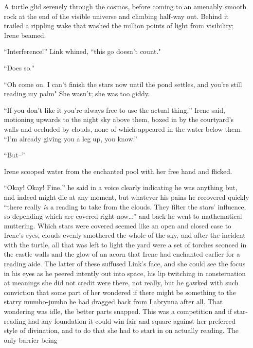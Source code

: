 \documentclass[../FGP.tex]{subfiles}
\begin{document}
A turtle glid serenely through the cosmos, before coming to an amenably smooth rock at the end of the visible universe and climbing half-way out. Behind it trailed a rippling wake that washed the million points of light from visibility; Irene beamed.

\normalmarginpar``Interference!'' Link whined, ``this go doesn't count."  

``Does so." 

``Oh come on. I can't finish the stars now until the pond settles, and you're still reading my palm" She wasn't; she was too giddy.

``If you don't like it you're always free to use the actual thing,'' Irene said, motioning upwards to the night sky above them, boxed in by the courtyard's walls and occluded by clouds, none of which appeared in the water below them. ``I'm already giving you a leg up, you know.''

``But--'' 

Irene scooped water from the enchanted pool with her free hand and flicked. 

``Okay! Okay! Fine,'' he said in a voice clearly indicating he was anything but, and indeed might die at any moment, but whatever his pains he recovered quickly ``there really \emph{is} a reading to take from the clouds. They filter the stars' influence, so depending which are covered right now\ldots'' and back he went to mathematical muttering. Which stars were covered seemed like an open and closed case to Irene's eyes, clouds evenly smothered the whole of the sky, and after the incident with the turtle, all that was left to light the yard were a set of torches sconced in the castle walls and the glow of an acorn that Irene had enchanted earlier for a reading aide. The latter of these suffused Link's face, and she could see the focus in his eyes as he peered intently out into space, his lip twitching in consternation at meanings she did not credit were there, not really, but he gawked with such conviction that some part of her wondered if there might be something to the starry mumbo-jumbo he had dragged back from Labrynna after all.%
That wondering was idle, the better parts snapped. This was a competition and if star-reading had any foundation it could win fair and square against her preferred style of divination,%
and to do that she had to start in on actually reading. The only barrier being--
 
\end{document}
